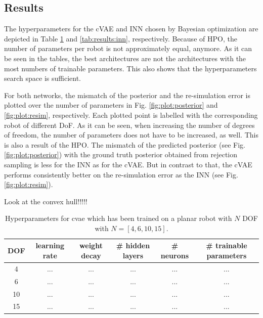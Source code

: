 \documentclass[conference]{IEEEtran}
\begin{document}
\subsection*{Results}

The hyperparameters for the cVAE and INN chosen by Bayesian optimization are depicted in Table \ref{tab:results:cvae} and \ref{tab:results:inn}, respectively. Because of HPO, the number of parameters per robot is not approximately equal, anymore. As it can be seen in the tables, the best architectures are not the architectures with the most numbers of trainable parameters. This also shows that the hyperparameters search space is sufficient. 

For both networks, the mismatch of the posterior and the re-simulation error is plotted over the number of parameters in Fig. \ref{fig:plot:posterior} and \ref{fig:plot:resim}, respectively. Each plotted point is labelled with the corresponding robot of different DoF. As it can be seen, when increasing the number of degrees of freedom, the number of parameters does not have to be increased, as well. This is also a result of the HPO. 
The mismatch of the predicted posterior (see Fig. \ref{fig:plot:posterior}) with the ground truth posterior obtained from rejection sampling is less for the INN as for the cVAE. But in contrast to that, the cVAE performs consistently better on the re-simulation error as the INN (see Fig. \ref{fig:plot:resim}).

Look at the convex hull!!!!!


\begin{table}[h]
\centering
\begin{tabular}{|c|c|c|c|c|c|}
\hline
 DOF & learning rate & weight decay & \# hidden layers & \# neurons & \# trainable parameters\\
 \hline
 4  & ...& ... & ... & ... & ...\\
 6  & ... & ...& ... & ... & ...\\
 10  & ... & ... & ... & ... & ...\\
 15  & ... & ... & ... & ... & ...\\
 \hline
\end{tabular}
\vspace{5pt}
\caption{\label{tab:results:cvae}  Hyperparameters for cvae which has been trained on a planar robot with $N$ DOF with $N=[4, 6, 10, 15]$.}
\end{table}
\end{document}
